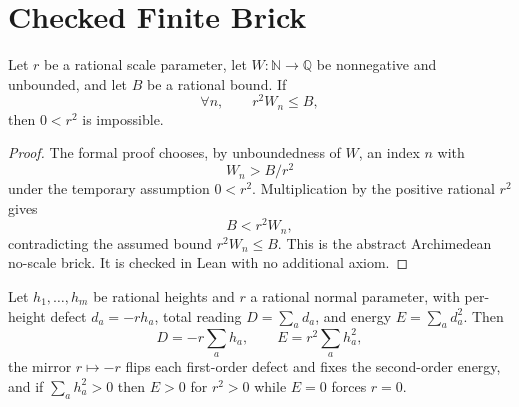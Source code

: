 \section{Checked Finite Brick}
\label{sec:rh-copenhagen-checked-finite-brick}

\begin{theorem}
\label{thm:rh-copenhagen-bounded-energy-excludes-positive-scale-apartness}
Let $r$ be a rational scale parameter, let
$W:\mathbb N\to\mathbb Q$ be nonnegative and unbounded, and let $B$ be a
rational bound.  If
$$
\forall n,\qquad r^2 W_n\le B,
$$
then $0<r^2$ is impossible.
\end{theorem}

\begin{proof}
The formal proof chooses, by unboundedness of $W$, an index $n$ with
$$
W_n>B/r^2
$$
under the temporary assumption $0<r^2$.  Multiplication by the positive
rational $r^2$ gives
$$
B<r^2W_n,
$$
contradicting the assumed bound $r^2W_n\le B$.  This is the abstract
Archimedean no-scale brick.  It is checked in Lean with no additional
axiom.
\end{proof}

\begin{theorem}
\label{thm:rh-normal-defect-ledger}
Let $h_1,\dots,h_m$ be rational heights and $r$ a rational normal
parameter, with per-height defect $d_a=-rh_a$, total reading
$D=\sum_a d_a$, and energy $E=\sum_a d_a^{2}$.  Then
$$
D=-r\sum_a h_a,\qquad E=r^{2}\sum_a h_a^{2},
$$
the mirror $r\mapsto-r$ flips each first-order defect and fixes the
second-order energy, and if $\sum_a h_a^{2}>0$ then $E>0$ for $r^{2}>0$
while $E=0$ forces $r=0$.
\end{theorem}

